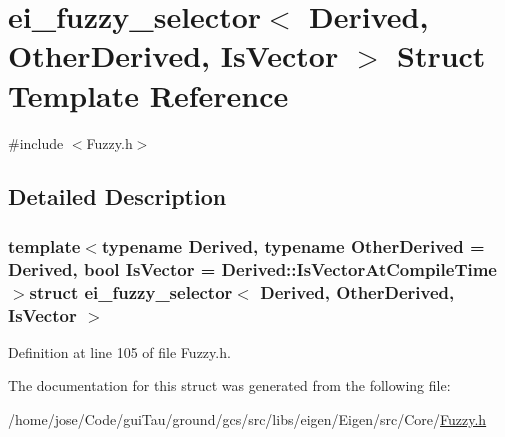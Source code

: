 \hypertarget{structei__fuzzy__selector}{\section{ei\-\_\-fuzzy\-\_\-selector$<$ Derived, Other\-Derived, Is\-Vector $>$ Struct Template Reference}
\label{structei__fuzzy__selector}
}


{\ttfamily \#include $<$Fuzzy.\-h$>$}



\subsection{Detailed Description}
\subsubsection*{template$<$typename Derived, typename Other\-Derived = Derived, bool Is\-Vector = Derived\-::\-Is\-Vector\-At\-Compile\-Time$>$struct ei\-\_\-fuzzy\-\_\-selector$<$ Derived, Other\-Derived, Is\-Vector $>$}



Definition at line 105 of file Fuzzy.\-h.



The documentation for this struct was generated from the following file\-:\begin{DoxyCompactItemize}
\item 
/home/jose/\-Code/gui\-Tau/ground/gcs/src/libs/eigen/\-Eigen/src/\-Core/\hyperlink{_fuzzy_8h}{Fuzzy.\-h}\end{DoxyCompactItemize}
